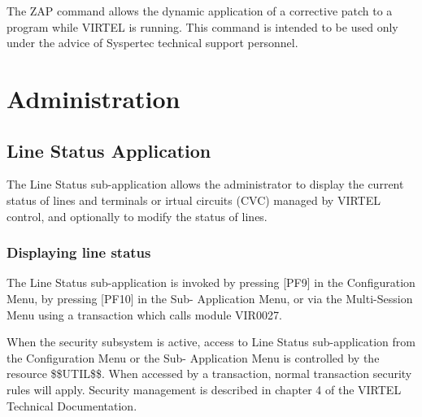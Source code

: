 \documentclass[letterpaper,10pt,english]{sphinxmanual}
\begin{document}
The ZAP command allows the dynamic application of a corrective patch to a program while VIRTEL is running. This command is intended to be used only under the advice of Syspertec technical support personnel.

\ignorespaces 

\chapter{Administration}
\label{\detokenize{audit_operations_ and_performance:administration}}\label{\detokenize{audit_operations_ and_performance:index-34}}
\ignorespaces 

\section{Line Status Application}
\label{\detokenize{audit_operations_ and_performance:line-status-application}}\label{\detokenize{audit_operations_ and_performance:index-35}}
The Line Status sub-application allows the administrator to display the current status of lines and terminals or irtual circuits (CVC) managed by VIRTEL control, and optionally to modify the status of lines.

\ignorespaces 

\subsection{Displaying line status}
\label{\detokenize{audit_operations_ and_performance:displaying-line-status}}\label{\detokenize{audit_operations_ and_performance:index-36}}
The Line Status sub-application is invoked by pressing {[}PF9{]} in the Configuration Menu, by pressing {[}PF10{]} in the Sub- Application Menu, or via the Multi-Session Menu using a transaction which calls module VIR0027.

When the security subsystem is active, access to Line Status sub-application from the Configuration Menu or the Sub- Application Menu is controlled by the resource \$\$UTIL\$\$.
When accessed by a transaction, normal transaction security rules will apply. Security management is described in chapter 4 of the VIRTEL Technical Documentation.
\end{document}
